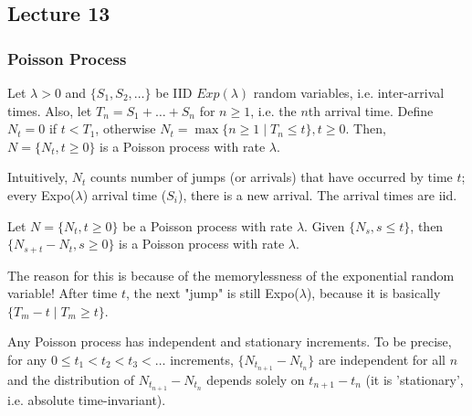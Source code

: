 \subsection{Lecture 13}
\subsubsection{Poisson Process}

\begin{definition}
    Let $\lambda > 0$ and $\{S_1, S_2, \dots \}$ be IID $Exp(\lambda)$ random variables, i.e. inter-arrival times.
    Also, let $T_n = S_1 + \dots + S_n$
    for $n \geq 1$, i.e. the $n$th arrival time. Define $N_t = 0$ if $t < T_1$, otherwise $N_t = \max\{n \geq 1 \mid T_n \leq t\}, t \geq 0$.
    Then, $N = \{N_t, t \geq 0\}$ is a Poisson process with rate $\lambda$.
\end{definition}

Intuitively,
$N_t$ counts number of jumps (or arrivals) that have occurred by time $t$; every Expo($\lambda$) arrival time ($S_i$), there is a new arrival.
The arrival times are iid.

\begin{theorem}
    Let $N = \{N_t, t \geq 0\}$ be a Poisson process with rate $\lambda$. Given $\{N_s, s \leq t\}$, then
    $\{N_{s + t} - N_t, s \geq 0\}$ is a Poisson process with rate $\lambda$.
\end{theorem}

The reason for this is because of the memorylessness of the exponential random variable! After time $t$, the next "jump" is
still Expo($\lambda$), because it is basically $\{ T_m - t \mid T_m \geq t \}$.

\begin{theorem}
    Any Poisson process has independent and stationary increments. To be precise,
    for any $0 \leq t_1 < t_2 < t_3 < \dots$ increments, $\{N_{t_{n + 1}} - N_{t_n}\}$ are
    independent for all $n$ and the distribution of $N_{t_{n + 1}} - N_{t_n}$ depends solely on $t_{n + 1} - t_n$
    (it is 'stationary', i.e. absolute time-invariant).
\end{theorem}

